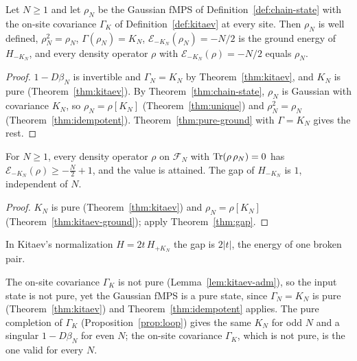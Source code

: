 \begin{theorem}\label{thm:kitaev-ground}
Let $N\geq1$ and let $\rho_N$ be the Gaussian fMPS of Definition~\ref{def:chain-state} with the
on-site covariance $\Gamma_K$ of Definition~\ref{def:kitaev} at every site. Then $\rho_N$ is
well defined, $\rho_N^2=\rho_N$, $\Gamma(\rho_N)=K_N$, $\mathcal E_{-K_N}(\rho_N)=-N/2$ is the ground
energy of $H_{-K_N}$, and every density operator $\rho$ with $\mathcal E_{-K_N}(\rho)=-N/2$ equals $\rho_N$.
\end{theorem}
\begin{proof}
$1-D\beta_N$ is invertible and $\Gamma_N=K_N$ by Theorem~\ref{thm:kitaev}, and $K_N$ is pure
(Theorem~\ref{thm:kitaev}). By Theorem~\ref{thm:chain-state}, $\rho_N$ is Gaussian with
covariance $K_N$, so $\rho_N=\rho[K_N]$ (Theorem~\ref{thm:unique}) and $\rho_N^2=\rho_N$
(Theorem~\ref{thm:idempotent}). Theorem~\ref{thm:pure-ground} with $\Gamma=K_N$ gives the rest.
\end{proof}

\begin{corollary}\label{cor:kitaev-gap}
For $N\geq1$, every density operator $\rho$ on $\mathcal F_N$ with $\operatorname{Tr}(\rho\,\rho_N)=0$ has
$\mathcal E_{-K_N}(\rho)\geq-\tfrac N2+1$, and the value is attained. The gap of $H_{-K_N}$ is $1$,
independent of $N$.
\end{corollary}
\begin{proof}
$K_N$ is pure (Theorem~\ref{thm:kitaev}) and $\rho_N=\rho[K_N]$ (Theorem~\ref{thm:kitaev-ground});
apply Theorem~\ref{thm:gap}.
\end{proof}
In Kitaev's normalization $H=2t\,H_{+K_N}$ the gap is $2|t|$, the energy of one broken pair.
\begin{remark}\label{rem:mixed-input}
The on-site covariance $\Gamma_K$ is not pure (Lemma~\ref{lem:kitaev-adm}), so the input
state is not pure, yet the Gaussian fMPS is a pure state, since $\Gamma_N=K_N$ is pure
(Theorem~\ref{thm:kitaev}) and Theorem~\ref{thm:idempotent} applies. The pure completion of $\Gamma_K$
(Proposition~\ref{prop:loop}) gives the same $K_N$ for odd $N$ and a singular $1-D\beta_N$ for
even $N$; the on-site covariance $\Gamma_K$, which is not pure, is the one valid for every $N$.
\end{remark}
